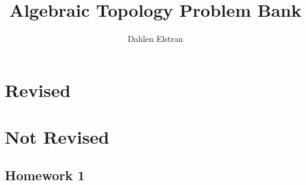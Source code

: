 \documentclass[12pt]{article}
\begin{document}
 
\title{Algebraic Topology Problem Bank} 
\author{Dahlen Elstran} 
\maketitle

\section{Revised}

\section{Not Revised}

\subsection{Homework 1}
\end{document}
